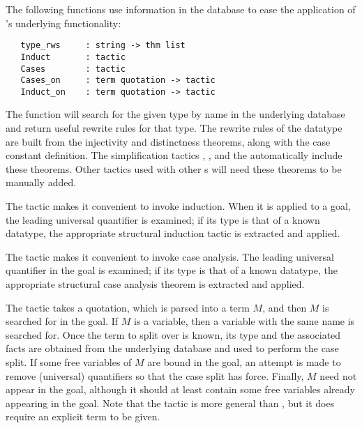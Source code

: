 The following functions use information in the database to ease the
application of \HOL's underlying functionality:

\begin{verbatim}
   type_rws     : string -> thm list
   Induct       : tactic
   Cases        : tactic
   Cases_on     : term quotation -> tactic
   Induct_on    : term quotation -> tactic
\end{verbatim}

%
The function  will search for the given type by name in
the underlying  database and return useful rewrite rules
for that type. The rewrite rules of the datatype are built from the
injectivity and distinctness theorems, along with the case constant
definition. The simplification tactics , ,
and the \simpset{}  automatically include these
theorems.  Other tactics used with other \simpset{}s will need these
theorems to be manually added.

%
The  tactic makes it convenient to invoke induction. When
it is applied to a goal, the leading universal quantifier is examined;
if its type is that of a known datatype, the appropriate structural
induction tactic is extracted and applied.

The  tactic makes it convenient to invoke case
analysis. The leading universal quantifier in the goal is examined; if
its type is that of a known datatype, the appropriate structural
case analysis theorem is extracted and applied.

The  tactic takes a quotation, which is
parsed into a term $M$, and then $M$ is searched for in the goal. If $M$
is a variable, then a variable with the same name is searched for. Once
the term to split over is known, its type and the associated facts are
obtained from the underlying database and used to perform the case
split. If some free variables of $M$ are bound in the goal, an attempt
is made to remove (universal) quantifiers so that the case split has
force. Finally, $M$ need not appear in the goal, although it should at
least contain some free variables already appearing in the goal. Note
that the  tactic is more general than , but
it does require an explicit term to be given.

